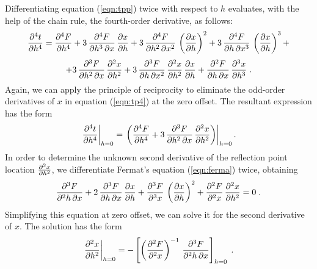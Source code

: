 Differentiating equation (\ref{eqn:tpp}) twice with respect to $h$ evaluates,
with the help of the chain rule, the fourth-order derivative, as
follows:
\begin{equation}
{{\partial^4 t} \over {\partial h^4}}  = 
{{\partial^4 F} \over {\partial h^4}} +
3\,{{\partial^4 F} \over {\partial h^3\,\partial x}}\,
{{\partial x} \over {\partial h}} +
3\,{{\partial^4 F} \over {\partial h^2\,\partial x^2}}\,
\left({{\partial x} \over {\partial h}}\right)^2 +
3\,{{\partial^4 F} \over {\partial h\,\partial x^3}}\,
\left({{\partial x} \over {\partial h}}\right)^3 + 
\nonumber 
\end{equation}
\begin{equation}
 +  3\,{{\partial^3 F} \over {\partial h^2\,\partial x}}\,
{{\partial^2 x} \over {\partial h^2}} +
3\,{{\partial^3 F} \over {\partial h\,\partial x^2}}\,
{{\partial^2 x} \over {\partial h^2}}\,
{{\partial x} \over {\partial h}} +
{{\partial^2 F} \over {\partial h\,\partial x}}\,
{{\partial^3 x} \over {\partial h^3}}\;.
\label{eqn:tp4}
\end{equation}
Again, we can apply the principle of reciprocity to eliminate the
odd-order derivatives of $x$ in equation (\ref{eqn:tp4}) at the zero
offset. The resultant expression has the form
\begin{equation}
\left.{{\partial^4 t} \over {\partial h^4}}\right|_{h=0} = 
\left.\left({{\partial^4 F} \over {\partial h^4}} +
3\,{{\partial^3 F} \over {\partial h^2\,\partial x}}\,
{{\partial^2 x} \over {\partial h^2}}\right)\right|_{h=0}.
\label{eqn:tp41}
\end{equation}
In order to determine the unknown second derivative of the reflection
point location ${{\partial^2 x} \over {\partial h^2}}$, we
differentiate Fermat's equation (\ref{eqn:ferma}) twice, obtaining
\begin{equation}
{{\partial^3 F} \over {\partial^2 h\,\partial x}} + 
2\,{{\partial^3 F} \over {\partial h\,\partial x}}\,
{{\partial x} \over {\partial h}} +
{{\partial^3 F} \over {\partial^3 x}}\,
\left({{\partial x} \over {\partial h}}\right)^2 +
{{\partial^2 F} \over {\partial^2 x}}\,
{{\partial^2 x} \over {\partial h^2}} = 0\;.
\label{eqn:ferma2}
\end{equation}
Simplifying this equation at zero offset, we can solve it for the
second derivative of $x$. The solution has the form
\begin{equation}
\left.{{\partial^2 x} \over {\partial h^2}}\right|_{h=0} = 
- \left[\left({{\partial^2 F} \over {\partial^2 x}}\right)^{-1}\,
{{\partial^3 F} \over {\partial^2 h\,\partial x}}\right]_{h=0}\;.
\label{eqn:dxdh}
\end{equation}

